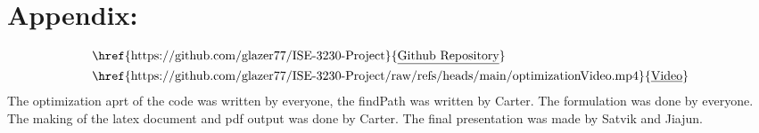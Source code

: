\documentclass[12pt]{extarticle}
\begin{document}
\newpage
\section*{\small Appendix:}
\begin{align*}
&\text{\href{https://github.com/glazer77/ISE-3230-Project}{\underline{Github Repository}}} \\
&\text{\href{https://github.com/glazer77/ISE-3230-Project/raw/refs/heads/main/optimizationVideo.mp4}{\underline{Video}}} \\
\end{align*}
The optimization aprt of the code was written by everyone, the findPath was written by Carter. The formulation was done by everyone. The making of the latex document and pdf output was done by Carter. The final presentation was made by Satvik and Jiajun.
\end{document}
